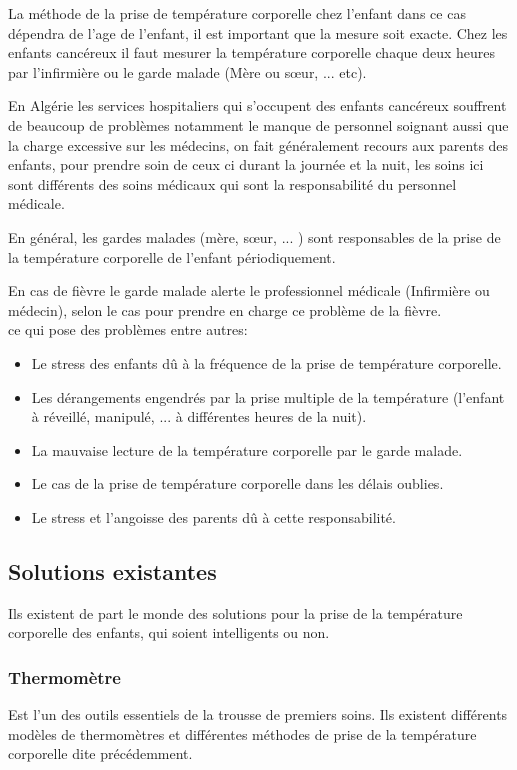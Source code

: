 \documentclass[12pt]{article}
\begin{document}
La méthode de la prise de température corporelle chez l'enfant dans ce cas dépendra de l’age de l’enfant, il est important que la mesure soit exacte. Chez les enfants cancéreux il faut mesurer la température corporelle chaque deux heures par l’infirmière ou le garde malade (Mère ou sœur, ... etc).

En Algérie les services hospitaliers qui s'occupent des enfants cancéreux souffrent de beaucoup de problèmes notamment le manque de personnel soignant aussi que la charge excessive sur les médecins, on fait généralement recours aux parents des enfants, pour prendre soin de ceux ci durant la journée et la nuit, les soins ici sont différents des soins médicaux qui sont la responsabilité du personnel médicale.

En général, les gardes malades (mère, sœur, ... ) sont responsables de la prise de la température corporelle de l'enfant périodiquement.

En cas de fièvre le garde malade alerte le professionnel médicale (Infirmière ou médecin), selon le cas pour prendre en charge ce problème de la fièvre.\\
ce qui pose des problèmes entre autres: 
\begin{itemize}
	\item Le stress des enfants dû à  la fréquence de la prise de température corporelle.
	\item Les dérangements engendrés par la prise multiple de la température (l'enfant à réveillé, manipulé, ... à différentes heures de la nuit).
	\item La mauvaise lecture de la température corporelle par le garde malade.
	\item Le cas de la prise de température corporelle  dans les délais oublies.
	\item Le stress et l'angoisse des parents dû à cette responsabilité.
\end{itemize}

\subsection{Solutions existantes}
Ils existent de part le monde des solutions pour la prise de la température corporelle des enfants, qui soient intelligents ou non.

\subsubsection*{Thermomètre}
Est l’un des outils essentiels de la trousse de premiers soins. Ils existent différents modèles de thermomètres et différentes méthodes de prise de la température corporelle dite précédemment.
\end{document}
